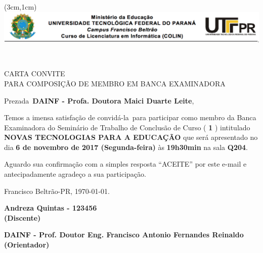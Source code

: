 \documentclass[12pt]{article}
\def \datadeentregadotrabalhoparadisciplina{25 de novembro de 2017} %
\def \profconvidado{DAINF - Profa. Doutora Maici Duarte Leite}
\def \profgenero{a}%
\def \tcc1outcc2{1}
\def \titulotrabalho{Novas Tecnologias para a Educação}
\def \discentecomra{Andreza Quintas - 123456}
\def \defesadatacompletacomdiadasemana{6 de novembro de 2017 (Segunda-feira)}
\def \defesahora{19h30min}
\def \defesasala{Q204}
\def \datadeentregadotrabalhoparaleitura{1 de novembro de 2017}
\def \proforientador{DAINF - Prof. Doutor Eng. Francisco Antonio Fernandes Reinaldo}
\begin{document}
\pagestyle{myheadings}
\newpage {}
\thispagestyle{empty}

\begin{center}
    \begin{textblock*}{\linewidth}(3cm,1cm)%
    \centering
    \includegraphics[width=\linewidth]{logo.png}
    \end{textblock*} ~\\[1em]
\end{center}

\vspace{\fill}
\begin{center}
\begin{large}
CARTA CONVITE\\[1em] PARA COMPOSIÇÃO DE MEMBRO EM BANCA EXAMINADORA
\end{large}
\end{center}

\vspace{\fill}
Prezad\profgenero\ \textbf{\profconvidado},

\vspace{\fill}
Temos a imensa satisfação de convidá-l\profgenero\ para participar como membro da Banca Examinadora do Seminário de Trabalho de Conclusão de Curso (
\textbf{\tcc1outcc2}
) intitulado 
\textbf{\MakeUppercase{\titulotrabalho}}
que será apresentado no dia 
\textbf{\defesadatacompletacomdiadasemana} às 
\textbf{\defesahora} na sala 
\textbf{\defesasala}.

%

Aguardo sua confirmação com a simples resposta ``ACEITE'' por este e-mail e antecipadamente agradeço a sua participação. 

\vspace{\fill}
\hspace{\fill} Francisco Beltrão-PR, \today.
\vspace{\fill}

\begin{center}
\linespread{1} \small 
\textbf{\discentecomra\\(Discente)}

\vspace{2em}
\textbf{\proforientador\\(Orientador)}
\end{center}


\end{document}
